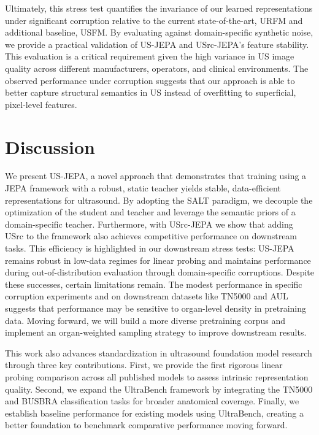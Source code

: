 \documentclass{article}
\theoremstyle{plain}
\theoremstyle{definition}
\theoremstyle{remark}
\begin{document}
Ultimately, this stress test quantifies the invariance of our learned representations under significant corruption relative to the current state-of-the-art, URFM and additional baseline, USFM. By evaluating against domain-specific synthetic noise, we provide a practical validation of US-JEPA and USrc-JEPA's feature stability. This evaluation is a critical requirement given the high variance in US image quality across different manufacturers, operators, and clinical environments. The observed performance under corruption suggests that our approach is able to better capture structural semantics in US instead of overfitting to superficial, pixel-level features.

\section{Discussion}

We present US-JEPA, a novel approach that demonstrates that training using a JEPA framework with a robust, static teacher yields stable, data-efficient representations for ultrasound. By adopting the SALT paradigm, we decouple the optimization of the student and teacher and leverage the semantic priors of a domain-specific teacher. Furthermore, with USrc-JEPA we show that adding USrc to the framework also achieves competitive performance on downstream tasks. This efficiency is highlighted in our downstream stress tests: US-JEPA remains robust in low-data regimes for linear probing and maintains performance during out-of-distribution evaluation through domain-specific corruptions. Despite these successes, certain limitations remain. The modest performance in specific corruption experiments and on downstream datasets like TN5000 and AUL suggests that performance may be sensitive to organ-level density in pretraining data. Moving forward, we will build a more diverse pretraining corpus and implement an organ-weighted sampling strategy to improve downstream results.

This work also advances standardization in ultrasound foundation model research through three key contributions. First, we provide the first rigorous linear probing comparison across all published models to assess intrinsic representation quality. Second, we expand the UltraBench framework by integrating the TN5000 and BUSBRA classification tasks for broader anatomical coverage. Finally, we establish baseline performance for existing models using UltraBench, creating a better foundation to benchmark comparative performance moving forward.
\end{document}
